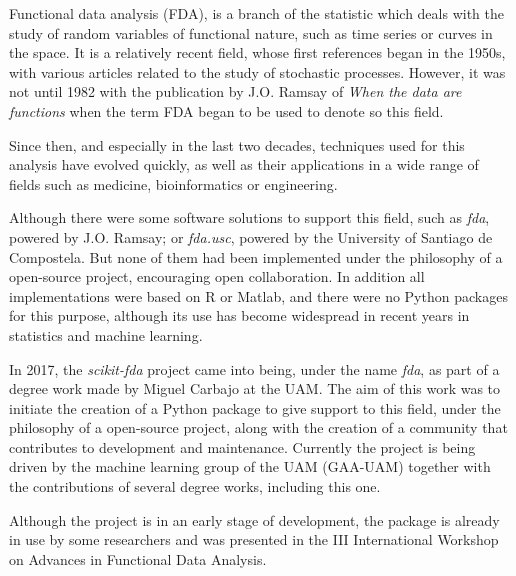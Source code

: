 

Functional data analysis (FDA), is a branch of the
statistic which deals with the study of random variables of
functional nature, such as time series or curves in the
space. It is a relatively recent field, whose first references
began in the 1950s, with various articles related to the study of stochastic
processes. However, it was not until 1982 with the publication by
J.O. Ramsay of \textit{When the data are functions}\cite{Ramsay1982} when the term FDA began
to be used to denote so this field.

Since then, and especially in the last two decades, techniques used for this analysis
have evolved quickly, as well as their applications in a wide range of fields
such as medicine, bioinformatics or engineering.

Although there were some software solutions to support this field, such as
\textit{fda}\cite{fda-r}, powered by J.O. Ramsay\cite{Ramsay2009}; or \textit{fda.usc}\cite{FdaUsc}, powered by the
University of Santiago de Compostela. But none of them had been implemented
under the philosophy of a open-source project, encouraging open collaboration.
In addition all implementations were based on R or Matlab, and there were no
Python packages for this purpose, although its use has become widespread in
recent years in statistics and machine learning.

In 2017, the \textit{scikit-fda} project came into being,
under the name \textit{fda}\cite{FDA2018}, as part of a degree work made by Miguel Carbajo
at the UAM. The aim of this work was to initiate the creation of a
Python package to give support to this field, under the philosophy of a open-source
project, along with the creation of a community that contributes to development
and maintenance. Currently the project is being driven by the machine
learning group of the UAM (GAA-UAM) together with the contributions of several
degree works, including this one.

Although the project is in an early stage of development, the package is already
in use by some researchers and was presented in the
III International Workshop on Advances in Functional Data Analysis\cite{workshop}.
